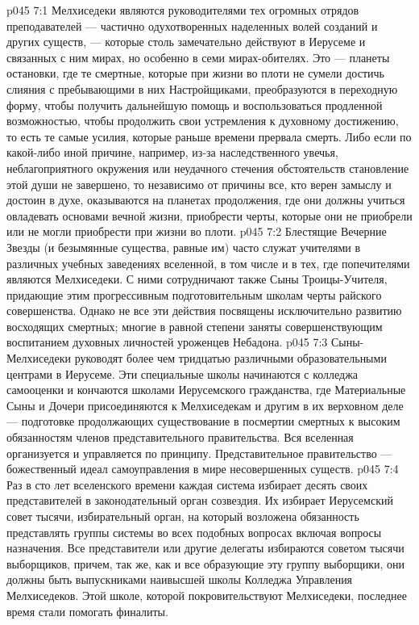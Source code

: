 \vs p045 7:1 Мелхиседеки являются руководителями тех огромных отрядов преподавателей --- частично одухотворенных наделенных волей созданий и других существ, --- которые столь замечательно действуют в Иерусеме и связанных с ним мирах, но особенно в семи мирах\hyp{}обителях. Это --- планеты остановки, где те смертные, которые при жизни во плоти не сумели достичь слияния с пребывающими в них Настройщиками, преобразуются в переходную форму, чтобы получить дальнейшую помощь и воспользоваться продленной возможностью, чтобы продолжить свои устремления к духовному достижению, то есть те самые усилия, которые раньше времени прервала смерть. Либо если по какой\hyp{}либо иной причине, например, из\hyp{}за наследственного увечья, неблагоприятного окружения или неудачного стечения обстоятельств становление этой души не завершено, то независимо от причины все, кто верен замыслу и достоин в духе, оказываются на планетах продолжения, где они должны учиться овладевать основами вечной жизни, приобрести черты, которые они не приобрели или не могли приобрести при жизни во плоти.
\vs p045 7:2 Блестящие Вечерние Звезды (и безымянные существа, равные им) часто служат учителями в различных учебных заведениях вселенной, в том числе и в тех, где попечителями являются Мелхиседеки. С ними сотрудничают также Сыны Троицы\hyp{}Учителя, придающие этим прогрессивным подготовительным школам черты райского совершенства. Однако не все эти действия посвящены исключительно развитию восходящих смертных; многие в равной степени заняты совершенствующим воспитанием духовных личностей уроженцев Небадона.
\vs p045 7:3 Сыны\hyp{}Мелхиседеки руководят более чем тридцатью различными образовательными центрами в Иерусеме. Эти специальные школы начинаются с колледжа самооценки и кончаются школами Иерусемского гражданства, где Материальные Сыны и Дочери присоединяются к Мелхиседекам и другим в их верховном деле --- подготовке продолжающих существование в посмертии смертных к высоким обязанностям членов представительного правительства. Вся вселенная организуется и управляется по  принципу. Представительное правительство --- божественный идеал самоуправления в мире несовершенных существ.
\vs p045 7:4 Раз в сто лет вселенского времени каждая система избирает десять своих представителей в законодательный орган созвездия. Их избирает Иерусемский совет тысячи, избирательный орган, на который возложена обязанность представлять группы системы во всех подобных вопросах включая вопросы назначения. Все представители или другие делегаты избираются советом тысячи выборщиков, причем, так же, как и все образующие эту группу выборщики, они должны быть выпускниками наивысшей школы Колледжа Управления Мелхиседеков. Этой школе, которой покровительствуют Мелхиседеки, последнее время стали помогать финалиты.
